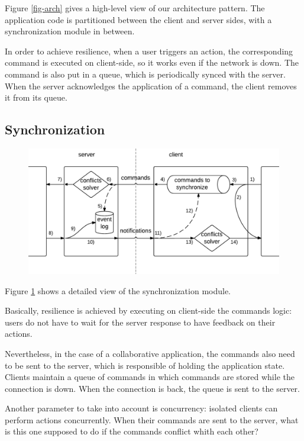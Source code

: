 \documentclass{acm_proc_article-sp}
\begin{document}
Figure \ref{fig-arch} gives a high-level view of our architecture pattern. The application code is partitioned between the client and server sides, with a synchronization module in between.

In order to achieve resilience, when a user triggers an action, the corresponding command is executed on client-side, so it works even if the network is down. The command is also put in a queue, which is periodically synced with the server. When the server acknowledges the application of a command, the client removes it from its queue.

\subsection{Synchronization}

\begin{figure}
\centering
\includegraphics[width=13cm]{arch-detail.pdf}
\label{fig-sync}
\end{figure}

Figure \ref{fig-sync} shows a detailed view of the synchronization module.

Basically, resilience is achieved by executing on client-side the commands logic: users do not have to wait for the server response to have feedback on their actions.

Nevertheless, in the case of a collaborative application, the commands also need to be sent to the server, which is responsible of holding the application state. Clients maintain a queue of commands in which commands are stored while the connection is down. When the connection is back, the queue is sent to the server.

Another parameter to take into account is concurrency: isolated clients can perform actions concurrently. When their commands are sent to the server, what is this one supposed to do if the commands conflict whith each other?
\end{document}

